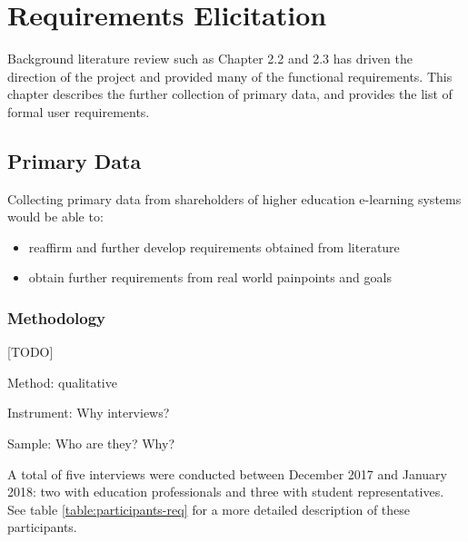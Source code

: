 \chapter{Requirements Elicitation}

Background literature review such as Chapter 2.2 and 2.3 has driven the direction of the project and 
provided many of the functional requirements. This chapter describes the further collection of primary 
data, and provides the list of formal user requirements.

\section{Primary Data}
Collecting primary data from shareholders of higher education e-learning systems would be able to:
\begin{itemize}
    \item reaffirm and further develop requirements obtained from literature
    \item obtain further requirements from real world painpoints and goals
\end{itemize}

\subsection{Methodology}

[TODO]

Method: qualitative

Instrument: Why interviews?

Sample: Who are they? Why?

A total of five interviews were conducted between December 2017 and January 2018: 
two with education professionals and three with student representatives. See table 
\ref{table:participants-req} for a more detailed description of these participants.

